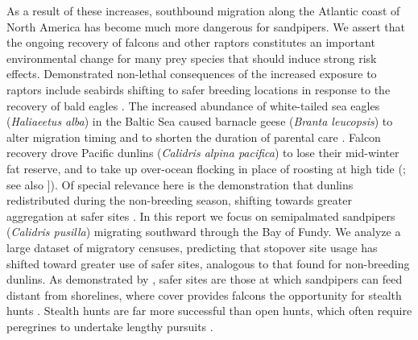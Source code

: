 As a result of these increases, southbound migration along the Atlantic coast of North America has become much more dangerous for sandpipers. We assert that the ongoing recovery of falcons and other raptors constitutes an important environmental change for many prey species that should induce strong risk effects. Demonstrated non-lethal consequences of the increased exposure to raptors include seabirds shifting to safer breeding locations in response to the recovery of bald eagles \citep[\textit{Haliaeetus leucocephalus}; ][]{MarkHipfner2012}. The increased abundance of white-tailed sea eagles (\textit{Haliaeetus alba}) in the Baltic Sea caused barnacle geese (\textit{Branta leucopsis}) to alter migration timing and to shorten the duration of parental care \citep{Jonker2010}. Falcon recovery drove Pacific dunlins (\textit{Calidris alpina pacifica}) to lose their mid-winter fat reserve, and to take up over-ocean flocking in place of roosting at high tide (\citealt{Ydenberg2010a}; see also \citealt{Dekker2011}]). Of special relevance here is the demonstration that dunlins redistributed during the non-breeding season, shifting towards greater aggregation at safer sites \citep{Ydenberg2017}. In this report we focus on semipalmated sandpipers (\textit{Calidris pusilla}) migrating southward through the Bay of Fundy. We analyze a large dataset of migratory censuses, predicting that stopover site usage has shifted toward greater use of safer sites, analogous to that found for non-breeding dunlins. As demonstrated by \citeauthor{ydenberg_western_2004} \citep[2004; ][]{pomeroy_experimental_2006}, safer sites are those at which sandpipers can feed distant from shorelines, where cover provides falcons the opportunity for stealth hunts \citep{dekker_raptor_2004}. Stealth hunts are far more successful than open hunts, which often require peregrines to undertake lengthy pursuits \citep[though see][for a contrasting prespective with multiple predators]{Cresswell2013}. 

